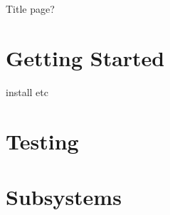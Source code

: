 \documentclass[12pt]{article}
\begin{document}
Title page?
\pagebreak

\tableofcontents

\section{Getting Started}
install etc

\section{Testing}

\pagebreak


\pagebreak


\pagebreak

\section{Subsystems}

\pagebreak


\pagebreak


\pagebreak
\end{document}
